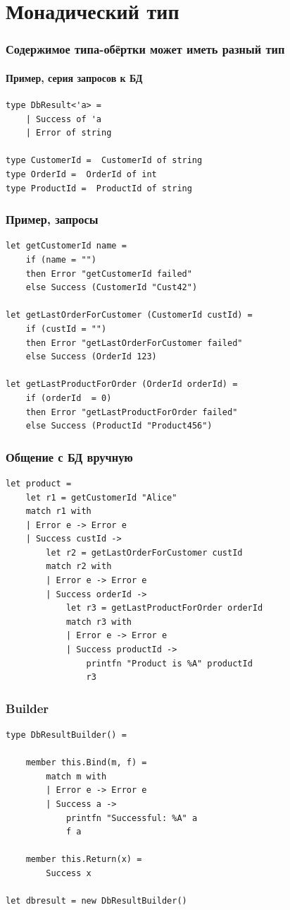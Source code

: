 \documentclass{../../slides-style}
\begin{document}
    \section{Монадический тип}

    \begin{frame}[fragile]
        \frametitle{Содержимое типа-обёртки может иметь разный тип}
        \framesubtitle{Пример, серия запросов к БД}
        \begin{verbatim}
type DbResult<'a> = 
    | Success of 'a
    | Error of string

type CustomerId =  CustomerId of string
type OrderId =  OrderId of int
type ProductId =  ProductId of string
        \end{verbatim}
    \end{frame}

    \begin{frame}[fragile]
        \frametitle{Пример, запросы}
        \begin{verbatim}
let getCustomerId name =
    if (name = "") 
    then Error "getCustomerId failed"
    else Success (CustomerId "Cust42")

let getLastOrderForCustomer (CustomerId custId) =
    if (custId = "") 
    then Error "getLastOrderForCustomer failed"
    else Success (OrderId 123)

let getLastProductForOrder (OrderId orderId) =
    if (orderId  = 0) 
    then Error "getLastProductForOrder failed"
    else Success (ProductId "Product456")
        \end{verbatim}
    \end{frame}

    \begin{frame}[fragile]
        \frametitle{Общение с БД вручную}
        \begin{verbatim}
let product = 
    let r1 = getCustomerId "Alice"
    match r1 with 
    | Error e -> Error e
    | Success custId ->
        let r2 = getLastOrderForCustomer custId 
        match r2 with 
        | Error e -> Error e
        | Success orderId ->
            let r3 = getLastProductForOrder orderId 
            match r3 with 
            | Error e -> Error e
            | Success productId ->
                printfn "Product is %A" productId
                r3
        \end{verbatim}
    \end{frame}

    \begin{frame}[fragile]
        \frametitle{Builder}
        \begin{verbatim}
type DbResultBuilder() =

    member this.Bind(m, f) = 
        match m with
        | Error e -> Error e
        | Success a -> 
            printfn "Successful: %A" a
            f a

    member this.Return(x) = 
        Success x

let dbresult = new DbResultBuilder()
        \end{verbatim}
    \end{frame}
\end{document}
